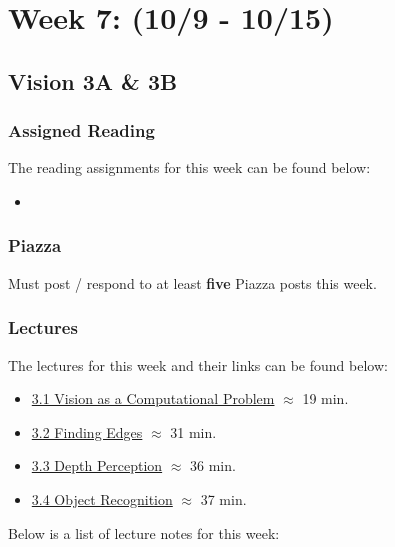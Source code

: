 \clearpage
\chapter{Week 7: (10/9 - 10/15)}

\section{Vision 3A \& 3B}

\subsection{Assigned Reading}

The reading assignments for this week can be found below:

\begin{itemize}
    \item {}
\end{itemize}

\subsection{Piazza}

Must post / respond to at least \textbf{five} Piazza posts this week.  

\subsection{Lectures}

The lectures for this week and their links can be found below:

\begin{itemize}
    \item \href{https://applied.cs.colorado.edu/mod/hvp/view.php?id=49374}{3.1 Vision as a Computational Problem} $\approx$ 19 min.
    \item \href{https://applied.cs.colorado.edu/mod/hvp/view.php?id=49375}{3.2 Finding Edges} $\approx$ 31 min.
    \item \href{https://applied.cs.colorado.edu/mod/hvp/view.php?id=49376}{3.3 Depth Perception} $\approx$ 36 min.
    \item \href{https://applied.cs.colorado.edu/mod/hvp/view.php?id=49377}{3.4 Object Recognition} $\approx$ 37 min.
\end{itemize}

\noindent Below is a list of lecture notes for this week:

